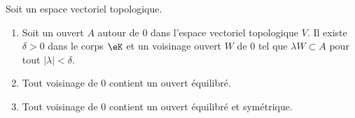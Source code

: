 \begin{lemma}     \label{LEMooYSWXooNqAcOQ}
	Soit un espace vectoriel topologique.
	\begin{enumerate}
		\item       \label{ITEMooSWWQooTreWIE}
		      Soit un ouvert \( A\) autour de \( 0\) dans l'espace vectoriel topologique \( V\). Il existe \( \delta>0\) dans le corps \( \eK\) et un voisinage ouvert \(W\) de \( 0\) tel que \( \lambda W\subset A\) pour tout \( | \lambda |<\delta\).
		\item       \label{ITEMooXZNHooGVplpu}
		      Tout voisinage de \( 0\) contient un ouvert équilibré.
		\item       \label{ITEMooRLVSooGihcLc}
		      Tout voisinage de \( 0\) contient un ouvert équilibré et symétrique.
	\end{enumerate}
\end{lemma}

